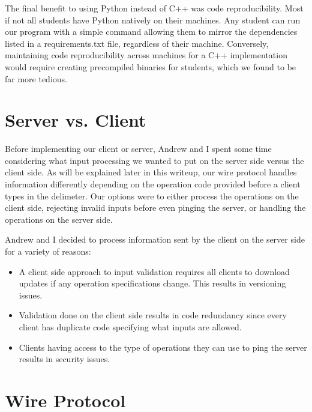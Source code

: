 \documentclass[
	a4paper, %
	10pt, %
	unnumberedsections, %
	twoside, %
]{LTJournalArticle}
\begin{document}
The final benefit to using Python instead of C++ was code reproducibility. Most if not all students have Python natively on their machines. Any student can run our program with a simple command allowing them to mirror the dependencies listed in a requirements.txt file, regardless of their machine. Conversely, maintaining code reproducibility across machines for a C++ implementation would require creating precompiled binaries for students, which we found to be far more tedious. 

\section{Server vs. Client}

Before implementing our client or server, Andrew and I spent some time considering what input processing we wanted to put on the server side versus the client side. As will be explained later in this writeup, our wire protocol handles information differently depending on the operation code provided before a client types in the delimeter. Our options were to either process the operations on the client side, rejecting invalid inputs before even pinging the server, or handling the operations on the server side. 

Andrew and I decided to process information sent by the client on the server side for a variety of reasons:
\begin{itemize}
    \item A client side approach to input validation requires all clients to download updates if any operation specifications change. This results in versioning issues. 
    \item Validation done on the client side results in code redundancy since every client has duplicate code specifying what inputs are allowed. 
    \item Clients having access to the type of operations they can use to ping the server results in security issues. 
\end{itemize}

\section{Wire Protocol}
\end{document}
